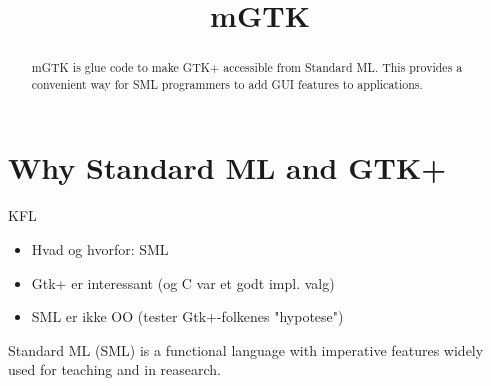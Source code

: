 \documentclass[workingdraft,endnotes]{usetex-v1}
\begin{document}
\title{mGTK}


\author{
\and
{}
%
} %

\maketitle

\begin{abstract}
  mGTK is glue code to make GTK+ accessible from Standard ML. This
  provides a convenient way for SML programmers to add GUI features to
  applications.
\end{abstract}


\section{Why Standard ML and GTK+}

\begin{ednote}{KFL}
  \begin{itemize}
  \item Hvad og hvorfor: SML  
  \item Gtk+ er interessant (og C var et godt
    impl. valg)  
  \item SML er ikke OO (tester Gtk+-folkenes "hypotese")
\end{itemize}
\end{ednote}

Standard ML (SML) is a functional language with imperative features
widely used for teaching and in reasearch. 
\end{document}
